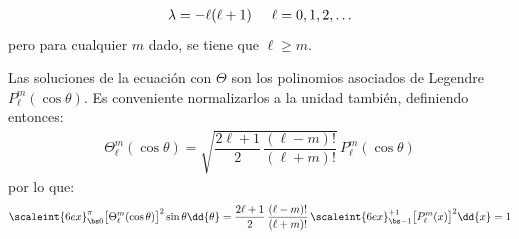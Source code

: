 \begin{align*}
\lambda = - \ell (\ell + 1) \hspace{0.5cm} \ell = 0, 1, 2, \ldots
\end{align*}
pero para cualquier $m$ dado, se tiene que $\ell \geq m$.
\par
Las soluciones de la ecuación con $\Theta$ son los polinomios asociados de Legendre $P_{\ell}^{m} (\cos \theta)$. Es conveniente normalizarlos a la unidad también, definiendo entonces:
\begin{align*}
\Theta_{\ell}^{m} (\cos \theta) = \sqrt{\dfrac{2 \ell + 1}{2} \, \dfrac{(\ell - m)!}{(\ell + m)!}} \, P_{\ell}^{m} (\cos \theta)
\end{align*}
por lo que:
\begin{align*}
\scaleint{6ex}_{\bs 0}^{\pi} \big[ \Theta_{\ell}^{m} (\cos \theta) \big]^{2} \sin \theta \dd{\theta} = \dfrac{2 \ell + 1}{2} \, \dfrac{(\ell - m)!}{(\ell + m)!} \, \scaleint{6ex}_{\bs -1}^{+1} \big[ P_{\ell}^{m}  (x) \big]^{2} \dd{x} = 1
\end{align*}


